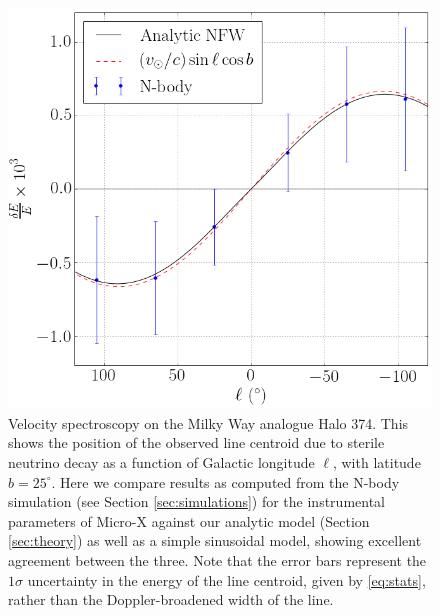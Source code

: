 \documentclass[aps,prd,10pt,twocolumn,superscriptaddress,showpacs]{revtex4-1}
\begin{document}
\begin{figure}[h!]
\centering
\includegraphics[width=1.0\columnwidth]{de_vs_l.png}
\caption{Velocity spectroscopy on the Milky Way analogue Halo 374. This shows the position of the observed line centroid due to sterile
	neutrino decay as a function of Galactic longitude $\ell$, with latitude $b=25^\circ$.
	Here we compare results as computed from the N-body simulation (see Section \ref{sec:simulations}) for the
	instrumental parameters of Micro-X against our analytic model (Section
	\ref{sec:theory}) as well as a simple sinusoidal model, showing excellent agreement between the
	three. Note that the error bars represent the $1\sigma$ uncertainty
in the energy of the line centroid, given by \eqref{eq:stats}, rather than the Doppler-broadened width of the line.}
\label{fig:de_vs_l}
\end{figure}

\end{document}
